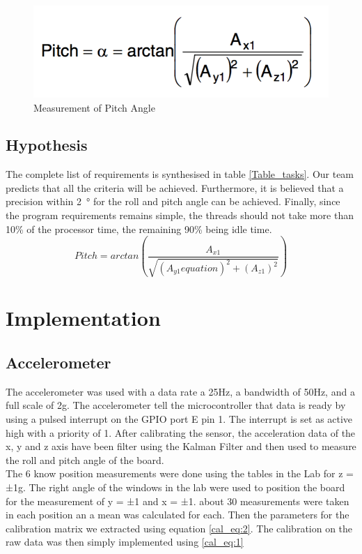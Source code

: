 ﻿\documentclass[12pt]{article}
\begin{document}
\begin{figure}[!htb]
 \centering
 \includegraphics[scale=0.50]{images/pitch.png}
 \caption{Measurement of Pitch Angle}
 \label{fig:pitch}
\end{figure}

\subsection{Hypothesis}
The complete list of requirements is synthesised in table \ref{Table_tasks}. Our team predicts that all the criteria will be achieved. Furthermore, it is believed that a precision within \SI{2}{\degree} for the roll and pitch angle can be achieved. Finally, since the program requirements remains simple, the threads should not take more than 10\% of the processor time, the remaining 90\% being idle time.
\begin{equation}
Pitch=arctan(\frac{A_{x1}}{\sqrt{(A_{y1}equation)^2+(A_{z1})^2}})
\end{equation}


\section{Implementation}
\subsection{Accelerometer}
The accelerometer was used with a data rate a 25Hz, a bandwidth of 50Hz, and a full scale of 2g. The accelerometer tell the microcontroller that data is ready by using a pulsed interrupt on the GPIO port E pin 1. The interrupt is set as active high with a priority of 1. After calibrating the sensor, the acceleration data of the x, y and z axis have been filter using the Kalman Filter and then used to measure the roll and pitch angle of the board. \\

The 6 know position measurements were done using the tables in the Lab for z = ±1g. The right angle of the windows in the lab were used to position the board for the measurement of y = ±1 and x = ±1. about 30 measurements were taken in each position an a mean was calculated for each. Then the parameters for the calibration matrix we extracted using equation \ref{cal_eq:2}. The calibration on the raw data was then simply implemented using \ref{cal_eq:1}
\end{document}
